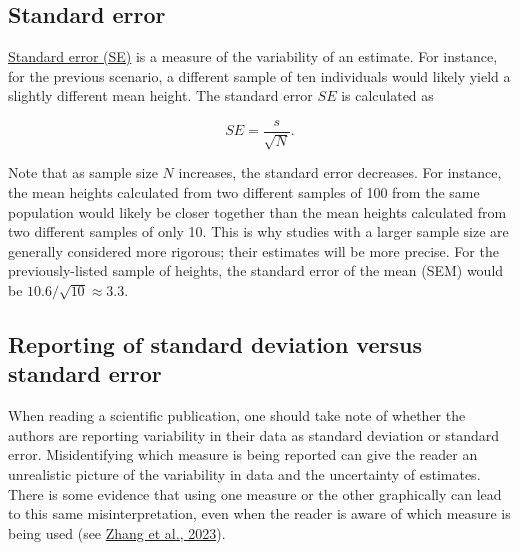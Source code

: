 \documentclass[letterpaper, 12pt]{article}
\begin{document}
\subsection*{Standard error}

\href{https://en.wikipedia.org/wiki/Standard_error}{Standard error (SE)} is a measure of the variability of an estimate. For instance, for the previous scenario, a different sample of ten individuals would likely yield a slightly different mean height. The standard error $SE$ is calculated as

$$
SE = \frac{s}{\sqrt{N}}.
$$

Note that as sample size $N$ increases, the standard error decreases. For instance, the mean heights calculated from two different samples of 100 from the same population would likely be closer together than the mean heights calculated from two different samples of only 10. This is why studies with a larger sample size are generally considered more rigorous; their estimates will be more precise. For the previously-listed sample of heights, the standard error of the mean (SEM) would be $10.6/\sqrt{10} \approx 3.3$.

\subsection*{Reporting of standard deviation versus standard error}

When reading a scientific publication, one should take note of whether the authors are reporting variability in their data as standard deviation or standard error. Misidentifying which measure is being reported can give the reader an unrealistic picture of the variability in data and the uncertainty of estimates. There is some evidence that using one measure or the other graphically can lead to this same misinterpretation, even when the reader is aware of which measure is being used (see \href{https://doi.org/10.1073/pnas.2302491120}{Zhang et al., 2023}).
\end{document}
